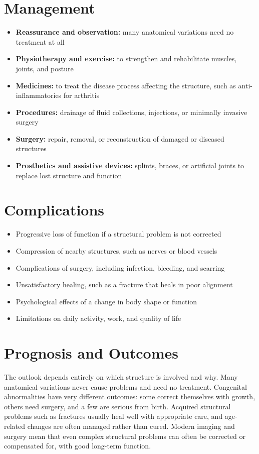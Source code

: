\section*{Management}
\begin{itemize}
    \item \textbf{Reassurance and observation:} many anatomical variations need no treatment at all
    \item \textbf{Physiotherapy and exercise:} to strengthen and rehabilitate muscles, joints, and posture
    \item \textbf{Medicines:} to treat the disease process affecting the structure, such as anti-inflammatories for arthritis
    \item \textbf{Procedures:} drainage of fluid collections, injections, or minimally invasive surgery
    \item \textbf{Surgery:} repair, removal, or reconstruction of damaged or diseased structures
    \item \textbf{Prosthetics and assistive devices:} splints, braces, or artificial joints to replace lost structure and function
\end{itemize}

\section*{Complications}
\begin{itemize}
    \item Progressive loss of function if a structural problem is not corrected
    \item Compression of nearby structures, such as nerves or blood vessels
    \item Complications of surgery, including infection, bleeding, and scarring
    \item Unsatisfactory healing, such as a fracture that heals in poor alignment
    \item Psychological effects of a change in body shape or function
    \item Limitations on daily activity, work, and quality of life
\end{itemize}

\section*{Prognosis and Outcomes}
The outlook depends entirely on which structure is involved and why. Many anatomical variations never cause problems and need no treatment. Congenital abnormalities have very different outcomes: some correct themselves with growth, others need surgery, and a few are serious from birth. Acquired structural problems such as fractures usually heal well with appropriate care, and age-related changes are often managed rather than cured. Modern imaging and surgery mean that even complex structural problems can often be corrected or compensated for, with good long-term function.

